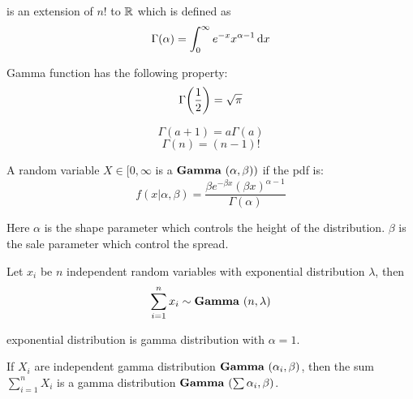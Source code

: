 \begin{definition}
     is an extension of $n!$ to $\mathbb{R}$ which is defined as
    \begin{equation}
        \Gamma(\alpha) = \int_0^\infty e^{-x} x^{\alpha - 1} \dif{x}
    \end{equation}

    Gamma function has the following property:
    \begin{equation}
        \Gamma \mleft(\frac{1}{2} \mright) = \sqrt{\pi}
    \end{equation}
    
    \begin{equation}
        \Gamma (a + 1) = a \Gamma(a)
    \end{equation}
    \begin{equation}
        \Gamma (n) = (n-1)!
    \end{equation}
\end{definition}


\begin{definition}
    A random variable $X \in [0,\infty$ is a  $\mathop{\bf Gamma\/}~(\alpha,\beta))$ if the pdf is:
    \begin{equation}
        f(x|\alpha, \beta) = \frac{\beta e^{-\beta x} (\beta x)^{\alpha - 1}}{\Gamma(\alpha)}
    \end{equation}   
    
    Here $\alpha$ is the shape parameter which controls the height of the distribution. $\beta$ is the sale parameter which control the spread.
\end{definition}

\begin{example}
    Let $x_i$ be $n$ independent random variables with exponential distribution $\lambda$, then
    \begin{equation}
        \sum_{i=1}^n x_i \sim \mathop{\bf Gamma\/}~(n,\lambda)
    \end{equation}
    
    exponential distribution is gamma distribution with $\alpha = 1$.
\end{example}

\begin{theorem}
    If $X_i$ are independent gamma distribution $\mathop{\bf Gamma\/}~(\alpha_i,\beta)$, then the sum $\displaystyle \sum_{i=1}^n X_i$ is a gamma distribution $\mathop{\bf Gamma\/}~(\sum \alpha_i,\beta)$.
\end{theorem}


